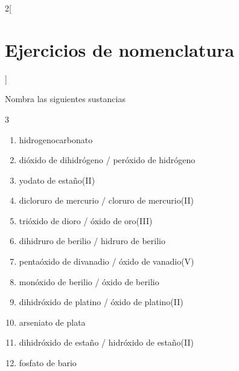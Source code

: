 \documentclass[10pt]{article}
\begin{document}
\begin{multicols*}{2}[
  \section{Ejercicios de nomenclatura}
  ]
\begin{exercise}[
    tags    = {inorgánica,nomenclatura,múltiple,2B},
    topics  = {química inorgánica,formulación,nomenclatura},
    source  = {Química 2B SAN 2016, p372, e9},
  ]
  Nombra las siguientes sustancias

  \begin{enumerate}\begin{multicols}{3}
    \item {}
    \item {}
    \item {}
    \item {}
    \item {}
    \item {}
    \item {}
    \item {}
    \item {}
    \item {}
    \item {}
    \item {}
  \end{multicols}\end{enumerate}
\end{exercise}

\begin{solution}
  \begin{enumerate}
    \item hidrogenocarbonato
    \item dióxido de dihidrógeno / peróxido de hidrógeno
    \item yodato de estaño(II)
    \item dicloruro de mercurio / cloruro de mercurio(II)
    \item trióxido de dioro / óxido de oro(III)
    \item dihidruro de berilio / hidruro de berilio
    \item pentaóxido de divanadio / óxido de vanadio(V)
    \item monóxido de berilio / óxido de berilio
    \item dihidróxido de platino / óxido de platino(II)
    \item arseniato de plata
    \item dihidróxido de estaño / hidróxido de estaño(II)
    \item fosfato de bario
  \end{enumerate}
\end{solution}





\end{multicols*}
\end{document}
